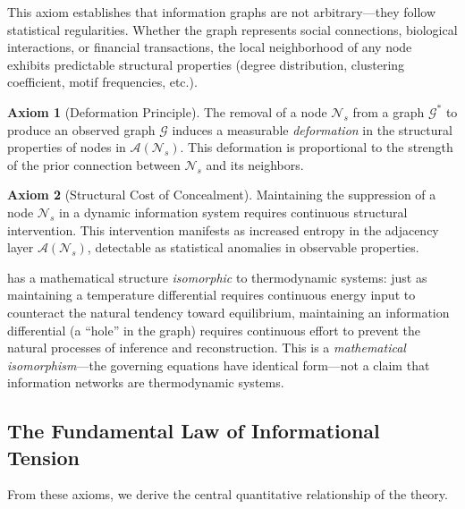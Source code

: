 \documentclass[12pt,a4paper]{article}
\theoremstyle{definition}
\newtheorem{axiom}{Axiom}
\theoremstyle{remark}
\newcommand{\NS}{\mathcal{N}_s}          %
\newcommand{\CA}{\mathcal{A}}            %
\newcommand{\Graph}{\mathcal{G}}         %
\begin{document}
This axiom establishes that information graphs are not arbitrary—they follow statistical regularities. Whether the graph represents social connections, biological interactions, or financial transactions, the local neighborhood of any node exhibits predictable structural properties (degree distribution, clustering coefficient, motif frequencies, etc.).

\begin{axiom}[Deformation Principle]
\label{ax:deformation}
The removal of a node $\NS$ from a graph $\Graph^*$ to produce an observed graph $\Graph$ induces a measurable \emph{deformation} in the structural properties of nodes in $\CA(\NS)$. This deformation is proportional to the strength of the prior connection between $\NS$ and its neighbors.
\end{axiom}

\begin{axiom}[Structural Cost of Concealment]
\label{ax:structural-cost}
Maintaining the suppression of a node $\NS$ in a dynamic information system requires continuous structural intervention. This intervention manifests as increased entropy in the adjacency layer $\CA(\NS)$, detectable as statistical anomalies in observable properties.
\end{axiom}

 has a mathematical structure \emph{isomorphic} to thermodynamic systems: just as maintaining a temperature differential requires continuous energy input to counteract the natural tendency toward equilibrium, maintaining an information differential (a ``hole'' in the graph) requires continuous effort to prevent the natural processes of inference and reconstruction. This is a \emph{mathematical isomorphism}---the governing equations have identical form---not a claim that information networks are thermodynamic systems.

\subsection{The Fundamental Law of Informational Tension}

From these axioms, we derive the central quantitative relationship of the theory.
\end{document}
